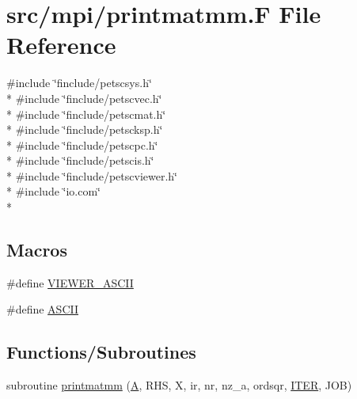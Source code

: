 \hypertarget{mpi_2printmatmm_8_f}{\section{src/mpi/printmatmm.F File Reference}
\label{mpi_2printmatmm_8_f}
}
{\ttfamily \#include \char`\"{}finclude/petscsys.\-h\char`\"{}}\\*
{\ttfamily \#include \char`\"{}finclude/petscvec.\-h\char`\"{}}\\*
{\ttfamily \#include \char`\"{}finclude/petscmat.\-h\char`\"{}}\\*
{\ttfamily \#include \char`\"{}finclude/petscksp.\-h\char`\"{}}\\*
{\ttfamily \#include \char`\"{}finclude/petscpc.\-h\char`\"{}}\\*
{\ttfamily \#include \char`\"{}finclude/petscis.\-h\char`\"{}}\\*
{\ttfamily \#include \char`\"{}finclude/petscviewer.\-h\char`\"{}}\\*
{\ttfamily \#include \char`\"{}io.\-com\char`\"{}}\\*
\subsection*{Macros}
\begin{DoxyCompactItemize}
\item 
\#define \hyperlink{mpi_2printmatmm_8_f_a37b9053035164bf12d78f6543776e413}{V\-I\-E\-W\-E\-R\-\_\-\-A\-S\-C\-I\-I}
\item 
\#define \hyperlink{mpi_2printmatmm_8_f_a60710bac11b4f1135f61ded06542d661}{A\-S\-C\-I\-I}
\end{DoxyCompactItemize}
\subsection*{Functions/\-Subroutines}
\begin{DoxyCompactItemize}
\item 
subroutine \hyperlink{mpi_2printmatmm_8_f_a6d69433a5976f1804547c9c3c5b589b8}{printmatmm} (\hyperlink{ibc2_8com_ad2108d58343608772fff791c23da58f5}{A}, R\-H\-S, X, ir, nr, nz\-\_\-a, ordsqr, \hyperlink{conv_8com_a5e8268d7a99a27a3889882b8cb685176}{I\-T\-E\-R}, J\-O\-B)
\end{DoxyCompactItemize}


